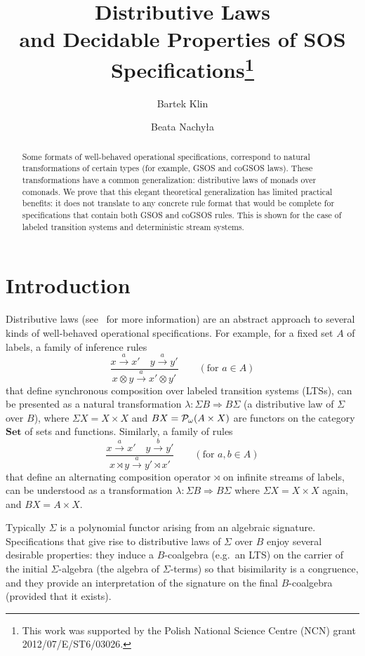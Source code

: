 \documentclass[adraft,copyright,creativecommons]{eptcs}
\title{Distributive Laws \\ and Decidable Properties of SOS Specifications\footnote{This work was supported by the Polish National Science Centre (NCN) grant 2012/07/E/ST6/03026.}}
\author{Bartek Klin
\institute{University of Warsaw}
\email{klin@mimuw.edu.pl}
\and
Beata Nachy\l{}a
\institute{Institute of Computer Science, 
Polish Academy of Sciences}
\email{beatanachyla@gmail.com}
}
\newcommand{\To}{\Longrightarrow}
\renewcommand{\S}{\Sigma}
\newcommand{\goes}[1]{\stackrel{#1}{\longrightarrow}}
\newcommand{\Pf}{{\cal P}_{\omega}}
\begin{document}
\maketitle

\begin{abstract}
Some formats of well-behaved operational specifications, correspond to natural transformations of certain types (for example, GSOS and coGSOS laws). These transformations have a common generalization: distributive laws of monads over comonads. We prove that this elegant theoretical generalization has limited practical benefits: it does not translate to any concrete rule format that would be complete for specifications that contain both GSOS and coGSOS rules. This is shown for the case of labeled transition systems and deterministic stream systems.

\end{abstract}

\vspace{-3ex}
\section{Introduction}

Distributive laws (see~\cite{turiplotkin,tcs11} for more information) are an abstract approach to several kinds of well-behaved operational specifications. For example, for a fixed set $A$ of labels, a family of inference rules
\[
	\dfrac{x\goes{a}x'\quad y\goes{a}y'}{x\otimes y\goes{a}x'\otimes{y'}} \qquad (\mbox{for }a\in A)
\]
that define synchronous composition over labeled transition systems (LTSs), can be presented as a natural transformation $\lambda:\S B\To B\S$ (a distributive law of $\S$ over $B$), where $\Sigma X=X\times X$ and $BX = \Pf(A\times X)$ are functors on the category $\textbf{Set}$ of sets and functions. Similarly, a family of rules
\[
	\dfrac{x\goes{a}x' \quad y\goes{b}y'}{x\rtimes y \goes{a}y'\rtimes x'} \qquad (\mbox{for }a,b\in A)
\]
that define an alternating composition operator $\rtimes$ on infinite streams of labels,
can be understood as a transformation $\lambda:\S B\To B\S$ where $\Sigma X=X\times X$ again, and $BX=A\times X$.

Typically $\S$ is a polynomial functor arising from an algebraic signature. Specifications that give rise to distributive laws of $\S$ over $B$ enjoy several desirable properties: they induce a $B$-coalgebra (e.g.~an LTS) on the carrier of the initial $\Sigma$-algebra (the algebra of $\Sigma$-terms) so that bisimilarity is a congruence, and they provide an interpretation of the signature on the final $B$-coalgebra (provided that it exists).
\end{document}
